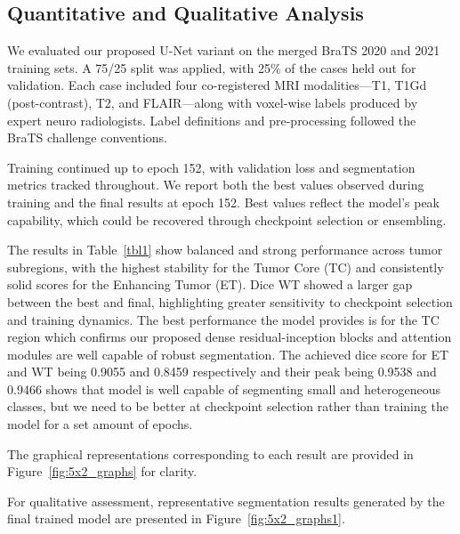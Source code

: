 \subsection{Quantitative and Qualitative Analysis}

We evaluated our proposed U-Net variant on the merged BraTS 2020 and 2021 training sets. A 75/25 split was applied, with 25\% of the cases held out for validation. Each case included four co-registered MRI modalities—T1, T1Gd (post-contrast), T2, and FLAIR—along with voxel-wise labels produced by expert neuro radiologists. Label definitions and pre-processing followed the BraTS challenge conventions.

Training continued up to epoch 152, with validation loss and segmentation metrics tracked throughout. We report both the best values observed during training and the final results at epoch 152. Best values reflect the model's peak capability, which could be recovered through checkpoint selection or ensembling.

The results in Table~\ref{tbl1} show balanced and strong performance across tumor subregions, with the highest stability for the Tumor Core (TC) and consistently solid scores for the Enhancing Tumor (ET). Dice WT showed a larger gap between the best and final, highlighting greater sensitivity to checkpoint selection and training dynamics. The best performance the model provides is for the TC region which confirms our proposed dense residual-inception blocks and attention modules are well capable of robust segmentation. The achieved dice score for ET and WT being 0.9055 and 0.8459 respectively and their peak being 0.9538 and 0.9466 shows that model is well capable of segmenting small and heterogeneous classes, but we need to be better at checkpoint selection rather than training the model for a set amount of epochs.

The graphical representations corresponding to each result are provided in Figure~\ref{fig:5x2_graphs} for clarity.

For qualitative assessment, representative segmentation results generated by the final trained model are presented in Figure~\ref{fig:5x2_graphs1}.

